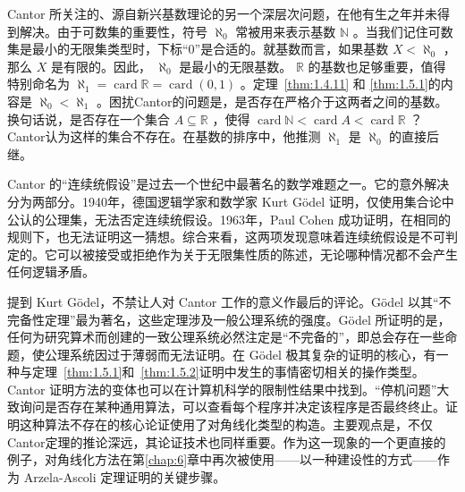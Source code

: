 Cantor 所关注的、源自新兴基数理论的另一个深层次问题，在他有生之年并未得到解决。由于可数集的重要性，符号 \({\aleph }_{0}\) 常被用来表示基数 \(\mathbb{N}\) 。当我们记住可数集是最小的无限集类型时，下标“0”是合适的。就基数而言，如果基数 \(X < {\aleph }_{0}\) ，那么 \(X\) 是有限的。因此， \({\aleph }_{0}\) 是最小的无限基数。 \(\mathbb{R}\) 的基数也足够重要，值得特别命名为 \(\aleph_1 = \operatorname{card}\mathbb{R} = \operatorname{card}\left( {0,1}\right)\) 。定理~\ref{thm:1.4.11} 和 \ref{thm:1.5.1}的内容是 \({\aleph }_{0} < \aleph_1\) 。困扰Cantor的问题是，是否存在严格介于这两者之间的基数。换句话说，是否存在一个集合 \(A \subseteq  \mathbb{R}\) ，使得 \(\operatorname{card}\mathbb{N} < \operatorname{card}A < \operatorname{card}\mathbb{R}\) ？Cantor认为这样的集合不存在。在基数的排序中，他推测 \(\aleph_1\) 是 \({\aleph }_{0}\) 的直接后继。

Cantor 的“连续统假设”是过去一个世纪中最著名的数学难题之一。它的意外解决分为两部分。1940年，德国逻辑学家和数学家 Kurt Gödel 证明，仅使用集合论中公认的公理集，无法否定连续统假设。1963年，Paul Cohen 成功证明，在相同的规则下，也无法证明这一猜想。综合来看，这两项发现意味着连续统假设是不可判定的。它可以被接受或拒绝作为关于无限集性质的陈述，无论哪种情况都不会产生任何逻辑矛盾。

提到 Kurt Gödel，不禁让人对 Cantor 工作的意义作最后的评论。Gödel 以其“不完备性定理”最为著名，这些定理涉及一般公理系统的强度。Gödel 所证明的是，任何为研究算术而创建的一致公理系统必然注定是“不完备的”，即总会存在一些命题，使公理系统因过于薄弱而无法证明。在 Gödel 极其复杂的证明的核心，有一种与定理~\ref{thm:1.5.1}和~\ref{thm:1.5.2}证明中发生的事情密切相关的操作类型。Cantor 证明方法的变体也可以在计算机科学的限制性结果中找到。“停机问题”大致询问是否存在某种通用算法，可以查看每个程序并决定该程序是否最终终止。证明这种算法不存在的核心论证使用了对角线化类型的构造。主要观点是，不仅Cantor定理的推论深远，其论证技术也同样重要。作为这一现象的一个更直接的例子，对角线化方法在第\ref{chap:6}章中再次被使用——以一种建设性的方式——作为 Arzela-Ascoli 定理证明的关键步骤。

